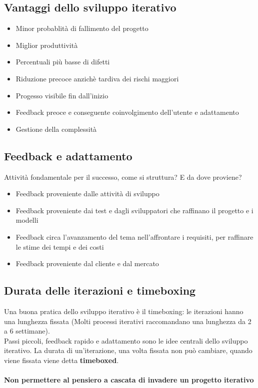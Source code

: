 \subsection{Vantaggi dello sviluppo iterativo}
\begin{itemize}
    \item Minor probablità di fallimento del progetto
    \item Miglior produttività
    \item Percentuali più basse di difetti
    \item Riduzione precoce anzichè tardiva dei rischi maggiori
    \item Progesso visibile fin dall'inizio
    \item Feedback preoce e conseguente coinvolgimento dell'utente e adattamento
    \item Gestione della complessità
\end{itemize}
\subsection{Feedback e adattamento}
Attività fondamentale per il successo, come si struttura? E da dove proviene?
\begin{itemize}
    \item Feedback proveniente dalle attività di sviluppo
    \item Feedback proveniente dai test e dagli sviluppatori che raffinano il progetto e i modelli
    \item Feedback circa l'avanzamento del tema nell'affrontare i requisiti, per raffinare le stime
    dei tempi e dei costi
    \item Feedback proveniente dal cliente e dal mercato
\end{itemize}
\subsection{Durata delle iterazioni e timeboxing}
Una buona pratica dello sviluppo iterativo è il timeboxing: le iterazioni
hanno una lunghezza fissata (Molti processi iterativi raccomandano una lunghezza da 
2 a 6 settimane).
\\ Passi piccoli, feedback rapido e adattamento sono le idee centrali dello
sviluppo iterativo.
La durata di un'iterazione, una volta fissata non può cambiare, quando viene fissata
viene detta \textbf{timeboxed}.
\paragraph*{Non permettere al pensiero a cascata di invadere un progetto iterativo}
